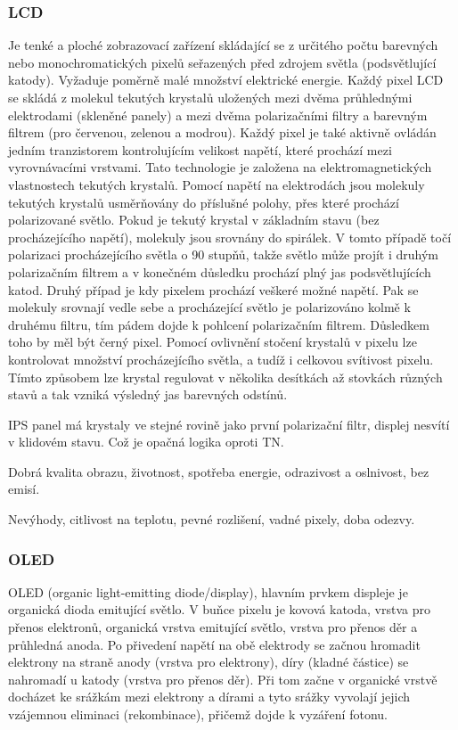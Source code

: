 \subsubsection{LCD}
Je tenké a ploché zobrazovací zařízení skládající se z určitého počtu barevných nebo monochromatických pixelů seřazených před zdrojem světla (podsvětlující katody). Vyžaduje poměrně malé množství elektrické energie. Každý pixel LCD se skládá z molekul tekutých krystalů uložených mezi dvěma průhlednými elektrodami (skleněné panely) a mezi dvěma polarizačními filtry a barevným filtrem (pro červenou, zelenou a modrou). Každý pixel je také aktivně ovládán jedním tranzistorem kontrolujícím velikost napětí, které prochází mezi vyrovnávacími vrstvami. Tato technologie je založena na elektromagnetických vlastnostech tekutých krystalů. Pomocí napětí na elektrodách jsou molekuly tekutých krystalů usměrňovány do příslušné polohy, přes které prochází polarizované světlo. Pokud je tekutý krystal v základním stavu (bez procházejícího napětí), molekuly jsou srovnány do spirálek. V tomto případě točí polarizaci procházejícího světla o 90 stupňů, takže světlo může projít i druhým polarizačním filtrem a v konečném důsledku prochází plný jas podsvětlujících katod. Druhý případ je kdy pixelem prochází veškeré možné napětí. Pak se molekuly srovnají vedle sebe a procházející světlo je polarizováno kolmě k druhému filtru, tím pádem dojde k pohlcení polarizačním filtrem. Důsledkem toho by měl být černý pixel. Pomocí ovlivnění stočení krystalů v pixelu lze kontrolovat množství procházejícího světla, a tudíž i celkovou svítivost pixelu. Tímto způsobem lze krystal regulovat v několika desítkách až stovkách různých stavů a tak vzniká výsledný jas barevných odstínů.

IPS panel má krystaly ve stejné rovině jako první polarizační filtr, displej nesvítí v klidovém stavu. Což je opačná logika oproti TN.



Dobrá kvalita obrazu, životnost, spotřeba energie, odrazivost a oslnivost, bez emisí.

Nevýhody, citlivost na teplotu, pevné rozlišení, vadné pixely, doba odezvy.

\subsubsection{OLED}
OLED (organic light-emitting diode/display), hlavním prvkem displeje je organická dioda emitující světlo.
V buňce pixelu je kovová katoda, vrstva pro přenos elektronů, organická vrstva emitující světlo, vrstva pro přenos děr a průhledná anoda. Po přivedení napětí na obě elektrody se začnou hromadit elektrony na straně anody (vrstva pro elektrony), díry (kladné částice) se nahromadí u katody (vrstva pro přenos děr). Při tom začne v organické vrstvě docházet ke srážkám mezi elektrony a dírami a tyto srážky vyvolají jejich vzájemnou eliminaci (rekombinace), přičemž dojde k vyzáření fotonu.

